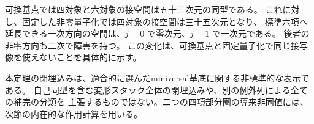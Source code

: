 \begin{remark}[基点を移した後の補完条件]
可換基点では四対象と六対象の接空間は五十三次元の同型である。
これに対し、固定した非零量子化では四対象の接空間は三十五次元となり、
標準六項へ延長できる一次方向の空間は、$j=0$ で零次元、$j=1$ で一次元である。
後者の非零方向も二次で障害を持つ。
この変化は、可換基点と固定量子化で同じ接写像を使えないことを具体的に示す。
\end{remark}

本定理の閉埋込みは、適合的に選んだminiversal基底に関する非標準的な表示である。
自己同型を含む変形スタック全体の閉埋込みや、別の例外列による全ての補完の分類を
主張するものではない。二つの四項部分圏の導来非同値には、次節の内在的な作用計算を用いる。
